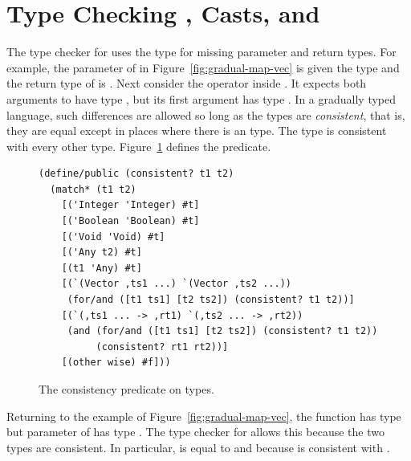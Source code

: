 \documentclass[11pt]{book}
\begin{document}
\section{Type Checking \LangGrad{}, Casts, and \LangCast{}}
\label{sec:gradual-type-check}

The type checker for \LangGrad{} uses the  type for missing
parameter and return types. For example, the  parameter of
 in Figure~\ref{fig:gradual-map-vec} is given the type
 and the return type of  is . Next
consider the \code{+} operator inside . It expects both
arguments to have type , but its first argument 
has type .  In a gradually typed language, such differences
are allowed so long as the types are \emph{consistent}, that is, they
are equal except in places where there is an  type. The type
 is consistent with every other type.
Figure~\ref{fig:consistent} defines the  predicate.

\begin{figure}[tbp]
\begin{lstlisting}
(define/public (consistent? t1 t2)
  (match* (t1 t2)
    [('Integer 'Integer) #t]
    [('Boolean 'Boolean) #t]
    [('Void 'Void) #t]
    [('Any t2) #t]
    [(t1 'Any) #t]
    [(`(Vector ,ts1 ...) `(Vector ,ts2 ...))
     (for/and ([t1 ts1] [t2 ts2]) (consistent? t1 t2))]
    [(`(,ts1 ... -> ,rt1) `(,ts2 ... -> ,rt2))
     (and (for/and ([t1 ts1] [t2 ts2]) (consistent? t1 t2))
          (consistent? rt1 rt2))]
    [(other wise) #f]))
\end{lstlisting}
\caption{The consistency predicate on types.}
\label{fig:consistent}
\end{figure}

Returning to the  example of
Figure~\ref{fig:gradual-map-vec}, the  function has type
 but parameter  of  has type
.  The type checker for \LangGrad{} allows this
because the two types are consistent.  In particular, \code{->} is
equal to \code{->} and because  is consistent with
.
\end{document}
